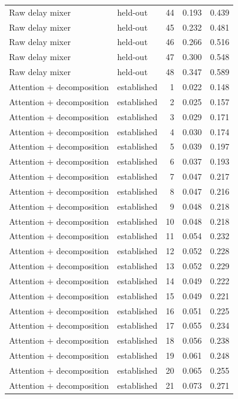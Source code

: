 \begin{tabular}{llrrr}
Raw delay mixer & held-out & 44 & 0.193 & 0.439 \\
Raw delay mixer & held-out & 45 & 0.232 & 0.481 \\
Raw delay mixer & held-out & 46 & 0.266 & 0.516 \\
Raw delay mixer & held-out & 47 & 0.300 & 0.548 \\
Raw delay mixer & held-out & 48 & 0.347 & 0.589 \\
Attention + decomposition & established & 1 & 0.022 & 0.148 \\
Attention + decomposition & established & 2 & 0.025 & 0.157 \\
Attention + decomposition & established & 3 & 0.029 & 0.171 \\
Attention + decomposition & established & 4 & 0.030 & 0.174 \\
Attention + decomposition & established & 5 & 0.039 & 0.197 \\
Attention + decomposition & established & 6 & 0.037 & 0.193 \\
Attention + decomposition & established & 7 & 0.047 & 0.217 \\
Attention + decomposition & established & 8 & 0.047 & 0.216 \\
Attention + decomposition & established & 9 & 0.048 & 0.218 \\
Attention + decomposition & established & 10 & 0.048 & 0.218 \\
Attention + decomposition & established & 11 & 0.054 & 0.232 \\
Attention + decomposition & established & 12 & 0.052 & 0.228 \\
Attention + decomposition & established & 13 & 0.052 & 0.229 \\
Attention + decomposition & established & 14 & 0.049 & 0.222 \\
Attention + decomposition & established & 15 & 0.049 & 0.221 \\
Attention + decomposition & established & 16 & 0.051 & 0.225 \\
Attention + decomposition & established & 17 & 0.055 & 0.234 \\
Attention + decomposition & established & 18 & 0.056 & 0.238 \\
Attention + decomposition & established & 19 & 0.061 & 0.248 \\
Attention + decomposition & established & 20 & 0.065 & 0.255 \\
Attention + decomposition & established & 21 & 0.073 & 0.271 \\

\end{tabular}
